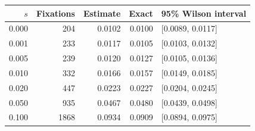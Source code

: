 \begin{tabular}{rrrrl}\toprule
\(s\) & Fixations & Estimate & Exact & 95\% Wilson interval\\\midrule
0.000 & 204 & 0.0102 & 0.0100 & [0.0089, 0.0117] \\
0.001 & 233 & 0.0117 & 0.0105 & [0.0103, 0.0132] \\
0.005 & 239 & 0.0120 & 0.0127 & [0.0105, 0.0136] \\
0.010 & 332 & 0.0166 & 0.0157 & [0.0149, 0.0185] \\
0.020 & 447 & 0.0223 & 0.0227 & [0.0204, 0.0245] \\
0.050 & 935 & 0.0467 & 0.0480 & [0.0439, 0.0498] \\
0.100 & 1868 & 0.0934 & 0.0909 & [0.0894, 0.0975] \\
\bottomrule\end{tabular}
